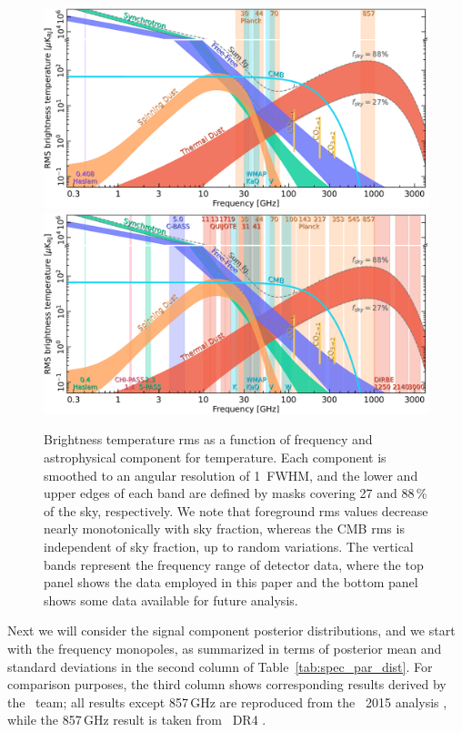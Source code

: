 \documentclass[twocolumn]{aa}
\begin{document}
\begin{figure}
  \center	
  \includegraphics[width=\linewidth]{figs/spectrum_BP_T.pdf}
  \includegraphics[width=\linewidth]{../BP_release_figs/BP8/sky-model/spectrum_long.pdf}  
  \caption{Brightness temperature rms as a function of frequency and astrophysical
    component for temperature. Each component is smoothed to an angular resolution
    of 1\deg\ FWHM, and the lower and upper edges of each band are defined by
    masks covering 27 and 88\,\% of the sky, respectively. We note that foreground rms values decrease nearly monotonically with sky fraction, whereas the CMB rms is independent of sky
    fraction, up to random variations. The vertical bands represent the frequency range of detector data, where the top panel shows the data employed in this paper and the bottom panel shows some data available for future analysis. %
    }
  \label{fig:fg_comp_spectrum}
\end{figure}


Next we will consider the signal component posterior distributions,
and we start with the frequency monopoles, as summarized in terms of
posterior mean and standard deviations in the second column of
Table~\ref{tab:spec_par_dist}. For comparison purposes, the third
column shows corresponding results derived by the \Planck\ team; all
results except 857\,GHz are reproduced from the \Planck\ 2015 analysis
\citep{planck2014-a12}, while the 857\,GHz result is taken from
\Planck\ DR4 \citep{npipe}.
\end{document}
